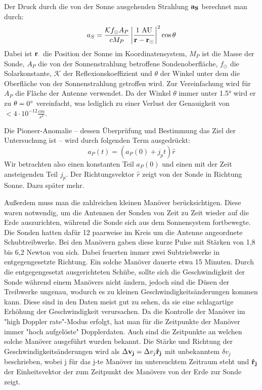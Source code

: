 Der Druck durch die von der Sonne ausgehenden Strahlung $\bf a_S$ berechnet man durch:
\begin{equation}
a_S = \frac{\mathcal{K}f_\odot A_P}{c M_P} \left| \frac{1\ \mathrm{AU}}{{\bf r}-{\bf r_\odot}} \right|^2 \cos\theta
\end{equation}
Dabei ist $\bf r_\cdot$ die Position der Sonne im Koordinatensystem, $M_P$ ist die Masse der Sonde, $A_P$ die von der Sonnenstrahlung betroffene Sondenoberfläche, $f_\odot$ die Solarkonstante, $\mathcal{K}$ der Reflexionskoeffizient und $\theta$ der Winkel unter dem die Oberfläche von der Sonnenstrahlung getroffen wird.
Zur Vereinfachung wird für $A_P$ die Fläche der Antenne verwendet.
Da der Winkel $\theta$ immer unter 1.5° wird er zu $\theta = 0\degree$ vereinfacht, was lediglich zu einer Verlust der Genauigkeit von $< 4 \cdot 10^{-12} \frac{cm}{s^2}$.\cite{Markwardt2002}

Die Pioneer-Anomalie – dessen Überprüfung und Bestimmung das Ziel der Untersuchung ist – wird durch folgenden Term ausgedrückt:
\begin{equation}
a_P(t) = \left( a_P(0) + j_pt\right)\hat{r}
\end{equation}
Wir betrachten also einen konstanten Teil $a_P(0)$ und einen mit der Zeit ansteigenden Teil $j_p$. Der Richtungsvektor $\hat{r}$ zeigt von der Sonde in Richtung Sonne. Dazu später mehr.

Außerdem muss man die zahlreichen kleinen Manöver berücksichtigen. Diese waren notwendig, um die Antennen der Sonden von Zeit zu Zeit wieder auf die Erde auszurichten, während die Sonde sich aus dem Sonnensystem fortbewegte. Die Sonden hatten dafür 12 paarweise im Kreis um die Antenne angeordnete Schubtreibwerke. Bei den Manövern gaben diese kurze Pulse mit Stärken von 1,8 bis 6,2 Newton von sich. Dabei feuerten immer zwei Subtriebwerke in entgegengesetzte Richtung. %
Ein solche Manöver dauerte etwa 15 Minuten.\cite{Anderson2002}
Durch die entgegengesetzt ausgerichteten Schübe, sollte sich die Geschwindigkeit der Sonde während einem Manövers nicht ändern, jedoch sind die Düsen der Treibwerke ungenau, wodurch es zu kleinen Geschwindigkeitsänderungen kommen kann.
Diese sind in den Daten meist gut zu sehen, da sie eine schlagartige Erhöhung der Geschwindigkeit verursachen. Da die Kontrolle der Manöver im "high Doppler rate"-Modus erfolgt, hat man für die Zeitpunkte der Manöver immer "hoch aufgelöste" Dopplerdaten. Auch sind die Zeitpunkte an welchen solche Manöver ausgeführt wurden bekannt. Die Stärke und Richtung der Geschwindigkeitsänderungen wird als $\Delta {\bf v_j } = \Delta v_j { \bf \hat{r}_j}$ mit unbekanntem $\delta v_j$ beschrieben, wobei j für das j-te Manöver im untersuchtem Zeitraum steht und ${\bf \hat{r}_j}$ der Einheitsvektor der zum Zeitpunkt des Manövers von der Erde zur Sonde zeigt.


